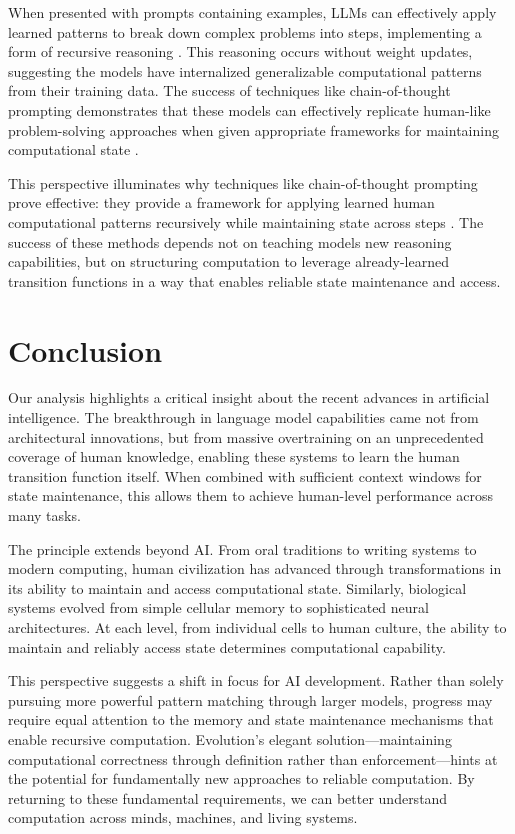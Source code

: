\documentclass[12pt]{article}
\begin{document}
When presented with prompts containing examples, LLMs can effectively apply learned patterns to break down complex problems into steps, implementing a form of recursive reasoning \cite{wei2022chain}.
This reasoning occurs without weight updates, suggesting the models have internalized generalizable computational patterns from their training data.
The success of techniques like chain-of-thought prompting demonstrates that these models can effectively replicate human-like problem-solving approaches when given appropriate frameworks for maintaining computational state \cite{wei2022emergent}.

This perspective illuminates why techniques like chain-of-thought prompting prove effective: they provide a framework for applying learned human computational patterns recursively while maintaining state across steps \cite{wei2022chain}.
The success of these methods depends not on teaching models new reasoning capabilities, but on structuring computation to leverage already-learned transition functions in a way that enables reliable state maintenance and access.


\section{Conclusion}

Our analysis highlights a critical insight about the recent advances in artificial intelligence.
The breakthrough in language model capabilities came not from architectural innovations, but from massive overtraining on an unprecedented coverage of human knowledge, enabling these systems to learn the human transition function itself.
When combined with sufficient context windows for state maintenance, this allows them to achieve human-level performance across many tasks.

The principle extends beyond AI.
From oral traditions to writing systems to modern computing, human civilization has advanced through transformations in its ability to maintain and access computational state.
Similarly, biological systems evolved from simple cellular memory to sophisticated neural architectures.
At each level, from individual cells to human culture, the ability to maintain and reliably access state determines computational capability.

This perspective suggests a shift in focus for AI development.
Rather than solely pursuing more powerful pattern matching through larger models, progress may require equal attention to the memory and state maintenance mechanisms that enable recursive computation.
Evolution's elegant solution---maintaining computational correctness through definition rather than enforcement---hints at the potential for fundamentally new approaches to reliable computation.
By returning to these fundamental requirements, we can better understand computation across minds, machines, and living systems.

\begingroup
\footnotesize


\endgroup
\end{document}
